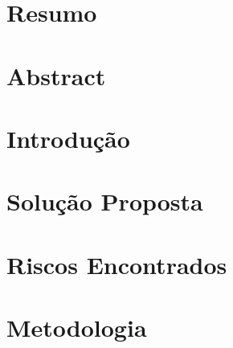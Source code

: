 % 

\chapter{Resumo} %


\chapter{Abstract} %




\chapter{Introdução} %


\chapter{Solução Proposta} %

\label{cha:solucao}


\chapter{Riscos Encontrados}



\chapter{Metodologia}

